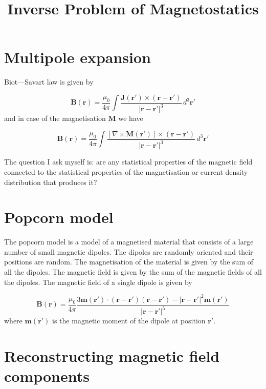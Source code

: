 \documentclass[justified]{tufte-handout}
\title{Inverse Problem of Magnetostatics}
\begin{document}
\maketitle

\section{Multipole expansion}

Biot---Savart law is given by

\begin{equation}
\mathbf{B}(\mathbf{r}) = \frac{\mu_0}{4\pi} \int \frac{\mathbf{J}(\mathbf{r}') \times (\mathbf{r} - \mathbf{r}')}{|\mathbf{r} - \mathbf{r}'|^3} \, d^3\mathbf{r}'
\end{equation}
and in case of the magnetisation $\mathbf{M}$ we have

\begin{equation}
\mathbf{B}(\mathbf{r}) = \frac{\mu_0}{4\pi} \int \frac{\left[\nabla\times\mathbf{M}(\mathbf{r}')\right] \times (\mathbf{r} - \mathbf{r}')}{|\mathbf{r} - \mathbf{r}'|^3} \, d^3\mathbf{r}'
\end{equation}

The question I ask myself is: are any statistical properties of the magnetic field
connected to the statistical properties of the magnetisation or current density distribution that
produces it?  

\section{Popcorn model}

The popcorn model is a model of a magnetised material that consists of a large number of 
small magnetic dipoles.  The dipoles are randomly oriented and their positions are random.
The magnetisation of the material is given by the sum of all the dipoles.  The magnetic field
is given by the sum of the magnetic fields of all the dipoles.  The magnetic field of a single
dipole is given by

\begin{equation}
\mathbf{B}(\mathbf{r}) = \frac{\mu_0}{4\pi} \frac{3\mathbf{m}(\mathbf{r}')\cdot(\mathbf{r} - \mathbf{r}')(\mathbf{r} - \mathbf{r}') - |\mathbf{r} - \mathbf{r}'|^2\mathbf{m}(\mathbf{r}')}{|\mathbf{r} - \mathbf{r}'|^5}
\end{equation}
where $\mathbf{m}(\mathbf{r}')$ is the magnetic moment of the dipole at position $\mathbf{r}'$.

\section{Reconstructing magnetic field components}
\end{document}
